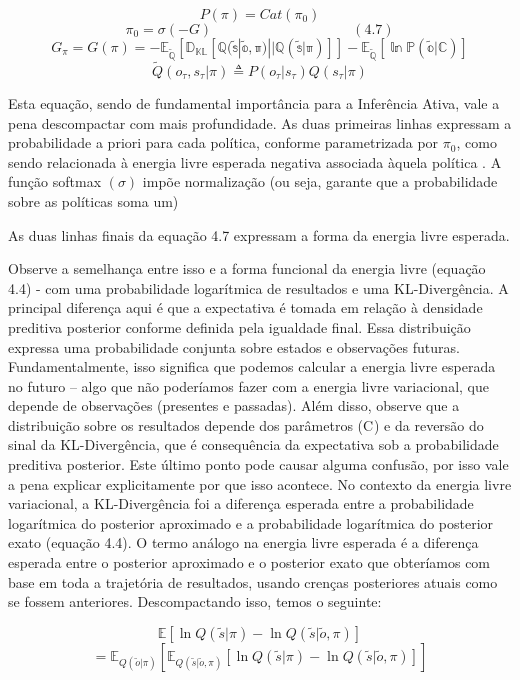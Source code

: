 \documentclass[
  12pt,
]{book}
\begin{document}
\[P(\pi)=Cat(\pi_0)\]
\[\pi_0=\sigma(-G) \qquad\qquad\qquad\qquad\qquad (4.7)\]
\[G_\pi = G(\pi)=-\mathbb{E_\tilde Q[D_{KL}[Q(\tilde s|\tilde o, \pi) || Q(\tilde s| \pi)]]}-\mathbb{E_\tilde Q[\ln P(\tilde o|C)]}\]
\[\tilde Q(o_\tau, s_\tau | \pi) \triangleq P(o_\tau |s_\tau)Q(s_\tau | \pi)\]

Esta equação, sendo de fundamental importância para a Inferência Ativa,
vale a pena descompactar com mais profundidade. As duas primeiras linhas
expressam a probabilidade a priori para cada política, conforme
parametrizada por \(\pi_0\), como sendo relacionada à energia livre
esperada negativa associada àquela política . A função softmax
\((\sigma)\) impõe normalização (ou seja, garante que a probabilidade
sobre as políticas soma um)

As duas linhas finais da equação 4.7 expressam a forma da energia livre
esperada.

Observe a semelhança entre isso e a forma funcional da energia livre
(equação 4.4) - com uma probabilidade logarítmica de resultados e uma
KL-Divergência. A principal diferença aqui é que a expectativa é tomada
em relação à densidade preditiva posterior conforme definida pela
igualdade final. Essa distribuição expressa uma probabilidade conjunta
sobre estados e observações futuras. Fundamentalmente, isso significa
que podemos calcular a energia livre esperada no futuro -- algo que não
poderíamos fazer com a energia livre variacional, que depende de
observações (presentes e passadas). Além disso, observe que a
distribuição sobre os resultados depende dos parâmetros (C ) e da
reversão do sinal da KL-Divergência, que é consequência da expectativa
sob a probabilidade preditiva posterior. Este último ponto pode causar
alguma confusão, por isso vale a pena explicar explicitamente por que
isso acontece. No contexto da energia livre variacional, a
KL-Divergência foi a diferença esperada entre a probabilidade
logarítmica do posterior aproximado e a probabilidade logarítmica do
posterior exato (equação 4.4). O termo análogo na energia livre esperada
é a diferença esperada entre o posterior aproximado e o posterior exato
que obteríamos com base em toda a trajetória de resultados, usando
crenças posteriores atuais como se fossem anteriores. Descompactando
isso, temos o seguinte:

\[\mathbb E[\ln Q(\tilde s | \pi) - \ln Q(\tilde s | \tilde o, \pi) ]\]
\[= \mathbb E_{Q(\tilde o|\pi)}[ \mathbb E_{Q(\tilde s | \tilde o,\pi)}[\ln Q(\tilde s|\pi) - \ln Q(\tilde s|\tilde o, \pi) ] ]\]
\end{document}
